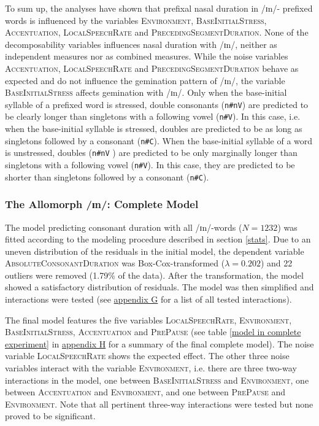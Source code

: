 To sum up, the analyses have shown that prefixal nasal duration in /ɪn/- prefixed words is influenced by the variables \textsc{Environment}, \textsc{BaseInitialStress}, \textsc{Accentuation}, \textsc{LocalSpeechRate} and \textsc{PrecedingSegmentDuration}. None of the decomposability variables influences nasal duration with /ɪn/, neither as independent measures nor as combined measures. 
While the noise variables \textsc{Accentuation}, \textsc{LocalSpeechRate} and \textsc{PrecedingSegmentDuration} behave as expected and do not influence the gemination pattern of /ɪn/, the variable \textsc{BaseInitialStress} affects gemination with /ɪn/. 
Only when the base-initial syllable of a prefixed word is stressed, double consonants (\texttt{n\#nV}) are predicted to be clearly longer than singletons with a following vowel (\texttt{n\#V}). In this case, i.e. when the base-initial syllable is stressed, doubles are predicted to be as long as singletons followed by a consonant (\texttt{n\#C}). When the base-initial syllable of a word is unstressed, doubles (\texttt{n\#nV} ) are predicted to be only marginally longer than singletons with a following vowel (\texttt{n\#V}). In this case, they are predicted to be shorter than singletons followed by a consonant (\texttt{n\#C}).

\subsubsection{The Allomorph /ɪn/: Complete Model}


The model predicting consonant duration with all /ɪn/-words ($N=1232$) was fitted according to the modeling procedure described in section \ref{stats}. Due to an uneven distribution of the residuals in the initial model, the dependent variable \textsc{AbsoluteConsonantDuration} was Box-Cox-transformed ($\lambda = 0.202$) and 22 outliers were removed (1.79\% of the data). 
After the transformation, the model showed a satisfactory distribution of residuals. The model was then simplified and interactions were tested (see \hyperref[Appendix G Summaries of tested interactions in experimental study]{appendix G} for a list of all tested interactions).




The final model features the five variables \textsc{LocalSpeechRate}, \textsc{Environment}, \textsc{BaseInitialStress}, \textsc{Accentuation} and \textsc{PrePause} (see table \ref{model in complete experiment} in \hyperref[Appendix H: Model Summaries Experiment]{appendix H} for a summary of the final complete model). 
The noise variable \textsc{LocalSpeechRate} shows the expected effect. The other three noise variables interact with the variable \textsc{Environment}, i.e. there are three two-way interactions in the model, one between \textsc{BaseInitialStress} and \textsc{Environment}, one between \textsc{Accentuation} and \textsc{Environment}, and one between \textsc{PrePause} and \textsc{Environment}.  Note that all pertinent three-way interactions were tested but none proved to be significant.


